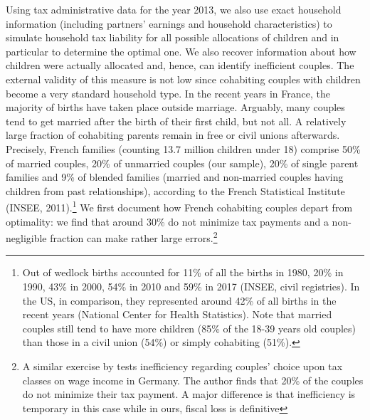 Using tax administrative data for the year 2013, we also use exact household information (including partners’ earnings and household characteristics) to simulate household tax liability for all possible allocations of children and in particular to determine the optimal one. We also recover information about how children were actually allocated and, hence, can identify inefficient couples. The external validity of this measure is not low since cohabiting couples with children become a very standard household type. In the recent years in France, the majority of births have taken place outside marriage. Arguably, many couples tend to get married after the birth of their first child, but not all. A relatively large fraction of cohabiting parents remain in free or civil unions afterwards. Precisely, French families (counting 13.7 million children under 18) comprise 50\% of married couples, 20\% of unmarried couples (our sample), 20\% of single parent families and 9\% of blended families (married and non-married couples having children from past relationships), according to the French Statistical Institute (INSEE, 2011).\footnote{
    Out of wedlock births accounted for 11\% of all the births in 1980, 20\% in 1990, 43\% in 2000, 54\% in 2010 and 59\% in 2017 (INSEE, civil registries). In the US, in comparison, they represented around 42\% of all births in the recent years (National Center for Health Statistics). Note that married couples still tend to have more children (85\% of the 18-39 years old couples) than those in a civil union (54\%) or simply cohabiting (51\%).
}
We first document how French cohabiting couples depart from optimality: we find that around 30\% do not minimize tax payments and a non-negligible fraction can make rather large errors.\footnote{
    A similar exercise by \citet{stowhase2011non} tests inefficiency regarding couples’ choice upon tax classes on wage income in Germany. The author finds that 20\% of the couples do not minimize their tax payment. A major difference is that inefficiency is temporary in this case while in ours, fiscal loss is definitive
}

